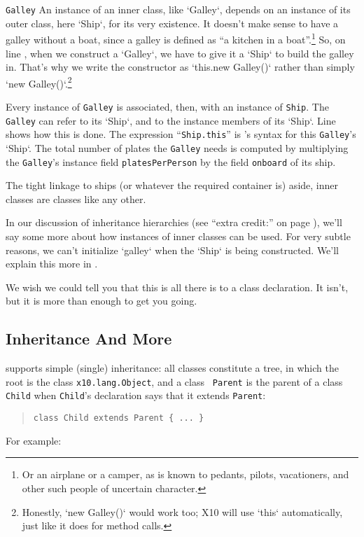 \begin{description}
\begin{finepoint} {\tt Galley}
An instance of an inner class, like \xcd`Galley`, depends on an instance of
its outer class, here \xcd`Ship`, for its very existence.  It doesn't make
sense to have a galley without a boat, since a galley is defined as ``a
kitchen in a boat''.\footnote{Or an airplane or a camper, as is known to
pedants, pilots, vacationers, and other such people of uncertain character.}   
So, on line , when we construct a \xcd`Galley`, we
have to give it a \xcd`Ship` to build the galley in. That's why we write the
constructor as \xcd`this.new Galley()` rather than simply 
\xcd`new Galley()`.\footnote{Honestly, \xcd`new Galley()` would work too; X10
will use 
\xcd`this` automatically, just like it does for method calls.}


Every instance of {\tt Galley} is associated, then, with an instance of
{\tt Ship}.  
The {\tt Galley} can refer to its \xcd`Ship`, and to the 
instance members of its \xcd`Ship`.  Line  shows how
this is done. 
The expression ``{\tt Ship.this}'' is \Xten's syntax
for this {\tt Galley}'s \xcd`Ship`. 
The total number of plates the {\tt Galley} needs is computed by
multiplying the {\tt Galley}'s instance field {\tt plates\-Per\-Person} 
by the field {\tt onboard} of its ship. 

The tight linkage to ships (or whatever the required container is) aside,
inner classes are classes like any other.   


In our discussion of inheritance hierarchies (see ``extra credit:''
on page \pageref{ssec:pinc}), we'll say some more
about how instances of inner classes can be used.
For very subtle reasons, we can't initialize \xcd`galley` when the \xcd`Ship`
is being constructed.  We'll explain this more in .  

\end{finepoint}
\end{description}

We wish we could tell you that this is all there is to a class declaration.  It isn't, but it
is more than enough to get you going.

\subsection{Inheritance And More}\label{sec:inh}

\Xten{} supports simple (single) inheritance: all \Xten{} classes constitute a
tree, in which the root is the class {\tt x10.lang.Object}, and a class {\tt
  Parent} is the parent of a class {\tt Child} when {\tt Child}'s declaration
says that it extends {\tt Parent}:
\begin{quote}{\tt class Child extends Parent \{ ... \}}\end{quote}
For example:

